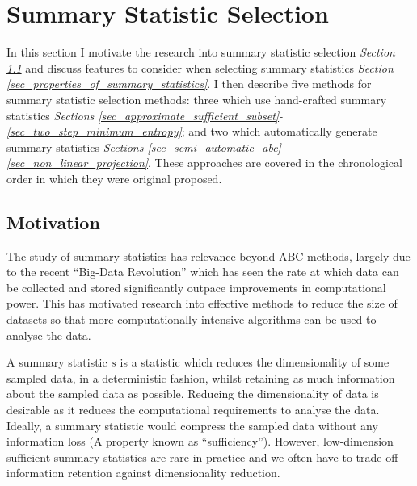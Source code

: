 \documentclass[11pt,a4paper]{article}
\theoremstyle{break}
\begin{document}
\newpage
\section{Summary Statistic Selection}\label{sec_summary_stats}


  In this section I motivate the research into summary statistic selection \textit{Section \ref{sec_summary_stats_motivation}} and discuss features to consider when selecting summary statistics \textit{Section \ref{sec_properties_of_summary_statistics}}. I then describe five methods for summary statistic selection methods: three which use hand-crafted summary statistics \textit{Sections \ref{sec_approximate_sufficient_subset}-\ref{sec_two_step_minimum_entropy}}; and two which automatically generate summary statistics \textit{Sections \ref{sec_semi_automatic_abc}-\ref{sec_non_linear_projection}}. These approaches are covered in the chronological order in which they were original proposed.

\subsection{Motivation}\label{sec_summary_stats_motivation}



  \par The study of summary statistics has relevance beyond ABC methods, largely due to the recent ``Big-Data Revolution'' which has seen the rate at which data can be collected and stored significantly outpace improvements in computational power. This has motivated research into effective methods to reduce the size of datasets so that more computationally intensive algorithms can be used to analyse the data. %

  \par A summary statistic $s$ is a statistic which reduces the dimensionality of some sampled data, in a deterministic fashion, whilst retaining as much information about the sampled data as possible. Reducing the dimensionality of data is desirable as it reduces the computational requirements to analyse the data. Ideally, a summary statistic would compress the sampled data without any information loss (A property known as ``sufficiency''). However, low-dimension sufficient summary statistics are rare in practice and we often have to trade-off information retention against dimensionality reduction.
\end{document}
